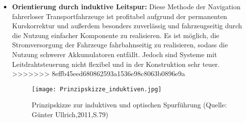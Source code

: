 \begin{itemize}
\begin{itemize}
\item \textbf{Orientierung durch induktive Leitspur:} Diese Methode der Navigation fahrerloser Transportfahrzeuge ist profitabel aufgrund der permanenten Kurskorrektur und au\ss erdem besonders zuverl\"assig und fahrzeugseitig durch die Nutzung einfacher Komponente zu realisieren.
Es ist m\"oglich, die Stromversorgung der Fahrzeuge fahrbahnseitig zu realisieren, sodass die Nutzung schwerer Akkumulatoren entf\"allt.
Jedoch sind Systeme mit Leitdrahtsteuerung nicht flexibel und in der Konstruktion sehr teuer.
>>>>>>> 8effb45eed680862593a1536e98c8063b0896e9a
\begin{figure}[h!]
	\centering
		\texttt{[image: Prinzipskizze\_induktiven.jpg]}
	\caption{Prinzipskizze zur induktiven und optischen Spurf\"uhrung (Quelle: G\"unter Ullrich,2011,S.79)}
	\label{Prinzipskizze_induktiven}
\end{figure}  


\end{itemize}
\end{itemize}
